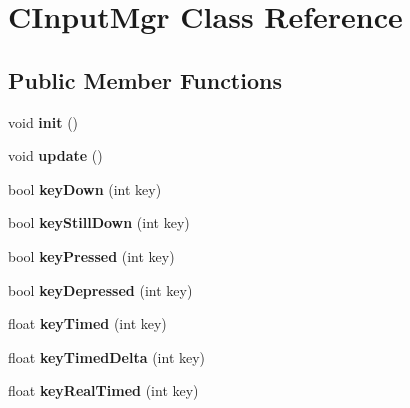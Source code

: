 \hypertarget{class_c_input_mgr}{
\section{CInputMgr Class Reference}
\label{class_c_input_mgr}
}
\subsection*{Public Member Functions}
\begin{DoxyCompactItemize}
\item 
\hypertarget{class_c_input_mgr_a354e4a02de3bb49daeee879cac3f8189}{
void {\bfseries init} ()}
\label{class_c_input_mgr_a354e4a02de3bb49daeee879cac3f8189}

\item 
\hypertarget{class_c_input_mgr_a1240434233028e97395653d3214d3fe2}{
void {\bfseries update} ()}
\label{class_c_input_mgr_a1240434233028e97395653d3214d3fe2}

\item 
\hypertarget{class_c_input_mgr_a87b01f891da9570661482695ea88e4e9}{
bool {\bfseries keyDown} (int key)}
\label{class_c_input_mgr_a87b01f891da9570661482695ea88e4e9}

\item 
\hypertarget{class_c_input_mgr_ad086321ebc06b04bf762c172f57536df}{
bool {\bfseries keyStillDown} (int key)}
\label{class_c_input_mgr_ad086321ebc06b04bf762c172f57536df}

\item 
\hypertarget{class_c_input_mgr_ae70a1c749bdec2fb69329d61cd740f81}{
bool {\bfseries keyPressed} (int key)}
\label{class_c_input_mgr_ae70a1c749bdec2fb69329d61cd740f81}

\item 
\hypertarget{class_c_input_mgr_a5624c8db09eac92d8c9f07b6e4d323ce}{
bool {\bfseries keyDepressed} (int key)}
\label{class_c_input_mgr_a5624c8db09eac92d8c9f07b6e4d323ce}

\item 
\hypertarget{class_c_input_mgr_acc871610bfc1eddf0dfcb990e871b1fb}{
float {\bfseries keyTimed} (int key)}
\label{class_c_input_mgr_acc871610bfc1eddf0dfcb990e871b1fb}

\item 
\hypertarget{class_c_input_mgr_a6317bd24ba62f89a802e15da6ffe96c4}{
float {\bfseries keyTimedDelta} (int key)}
\label{class_c_input_mgr_a6317bd24ba62f89a802e15da6ffe96c4}

\item 
\hypertarget{class_c_input_mgr_a48ded33c3771a574655daaf2b2583134}{
float {\bfseries keyRealTimed} (int key)}
\label{class_c_input_mgr_a48ded33c3771a574655daaf2b2583134}


\end{DoxyCompactItemize}
